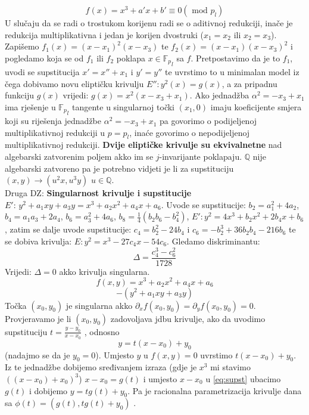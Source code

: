 \documentclass[12pt, a4paper]{article}
\begin{document}
\begin{multicols}{3}
{\footnotesize \[f(x)=x^3+a'x+b' \equiv 0 (\textrm{ mod } p_l)\]}
U slučaju da se radi o trostukom korijenu radi se o aditivnoj redukciji, inače je redukcija multiplikativna i jedan je korijen dvostruki ($x_1=x_2$ ili $x_2=x_3$). Zapišemo $f_1(x)=(x-x_1)^2(x-x_3)$ te $f_2(x)=(x-x_1)(x-x_3)^2$ i pogledamo koja se od $f_1$ ili $f_2$ poklapa $x \in {\mathbb{F}_p}_l$  sa $f$. Pretpostavimo da je to $f_1$, uvodi se supstitucija $x'=x''+x_1$ i $y'=y''$ te uvrstimo to u minimalan model 	iz čega dobivamo novu eliptičku krivulju $E'' : y^2(x)=g(x)$, a za pripadnu funkciju $g(x)$ vrijedi: $g(x)=x^2(x-x_3+x_1)$. Ako jednadžba $\alpha ^2=-x_3+x_1$ ima rješenje u ${\mathbb{F}_p}_l$ tangente u singularnoj točki $(x_1,0)$ imaju koeficijente smjera koji su riješenja jednadžbe  $\alpha ^2=-x_3+x_1$ pa govorimo o podijeljenoj multiplikativnoj redukciji u $p=p_l$, inaće govorimo o nepodijeljenoj multiplikativnoj redukciji.
\textbf{Dvije eliptičke krivulje su ekvivalnetne} nad algebarski zatvorenim  poljem akko im se $j$-invarijante poklapaju. $\mathbb{Q}$ nije algebarski zatvoreno pa je potrebno vidjeti je li za supstituciju $(x,y) \to (u^2x, u^3y)$ $u \in \mathbb{Q}$.
\\ Druga DZ: \textbf{Singularnost krivulje i supstitucije} $E':\, y^2+a_1xy+a_3y=x^3+a_2x^2+a_4x+a_6$. Uvode se supstitucije: $b_2=a_1^2+4a_2$, $b_4=a_1a_3+2a_4$, $b_6=a_3^2+4a_6$, $b_8=\frac{1}{4}(b_2b_6-b_4^2)$, $E': y^2=4x^3+b_2x^2+2b_4x+b_6$, zatim se dalje uvode supstitucije: $c_4=b_2^2-24b_4$ i $c_6=-b_2^3+36b_2b_4-216b_6$ te se dobiva krivulja: $E: y^2=x^3-27c_4x-54c_6$. Gledamo diskriminantu:\[\Delta=\frac{c_4^3-c_6^2}{1728}\]
Vrijedi: $\Delta=0 $ akko krivulja singularna.\\
\[f(x,y)=x^3+a_2x^2+a_4x+a_6\]\[-(y^2+a_1xy+a_3y)\]
Točka $(x_0, y_0)$ je singularna akko $\partial_x f(x_0,y_0)=\partial_y f(x_0,y_0)=0$. Provjeravamo je li $(x_0,y_0)$ zadovoljava jdbu krivulje, ako da uvodimo supstituciju $t=\frac{y-y_0}{x-x_0}$ , odnosno
\begin{equation}
\label{eq:supst}
y=t(x-x_0)+y_0 
\end{equation}
(nadajmo se da je $y_0=0$). Umjesto $y$ u $f(x,y)=0$ uvrstimo  $t(x-x_0)+y_0$. Iz te jednadžbe dobijemo sređivanjem izraza (gdje je $x^3$ mi stavimo $((x-x_0)+x_0)^3$) $x-x_0=g(t)$ i umjesto $x-x_0$ u \ref{eq:supst} ubacimo $g(t)$ i dobijemo $y=tg(t)+y_0$. Pa je racionalna parametrizacija krivulje dana sa $\phi (t)=(g(t), tg(t)+y_0)$ .
\end{multicols}
\end{document}
